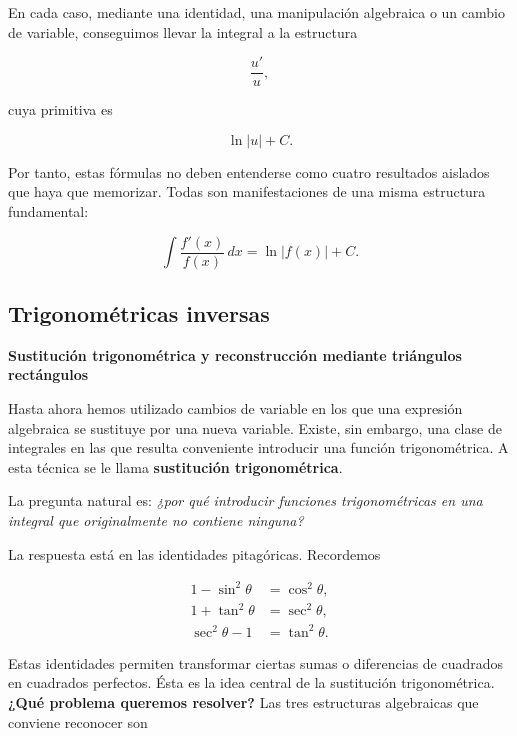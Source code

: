 \documentclass[12pt]{article}
\theoremstyle{definition}
\theoremstyle{remark}
\begin{document}
En cada caso, mediante una identidad, una manipulación algebraica
o un cambio de variable, conseguimos llevar la integral a la
estructura

\[
\boxed{\frac{u'}{u}},
\]

cuya primitiva es

\[
\boxed{\ln|u|+C}.
\]

Por tanto, estas fórmulas no deben entenderse como cuatro resultados
aislados que haya que memorizar. Todas son manifestaciones de una
misma estructura fundamental:

\[
\boxed{
\int\frac{f'(x)}{f(x)}\,dx
=
\ln|f(x)|+C.
}
\]



\subsection*{Trigonom\'etricas inversas}
\textbf{Sustitución trigonométrica y reconstrucción mediante triángulos rectángulos}

Hasta ahora hemos utilizado cambios de variable en los que una expresión
algebraica se sustituye por una nueva variable. Existe, sin embargo, una
clase de integrales en las que resulta conveniente introducir una función
trigonométrica. A esta técnica se le llama \textbf{sustitución trigonométrica}.

La pregunta natural es: \emph{¿por qué introducir funciones trigonométricas
en una integral que originalmente no contiene ninguna?}

La respuesta está en las identidades pitagóricas. Recordemos

\[
\boxed{
\begin{aligned}
1-\sin^2\theta&=\cos^2\theta,\\
1+\tan^2\theta&=\sec^2\theta,\\
\sec^2\theta-1&=\tan^2\theta.
\end{aligned}}
\]

Estas identidades permiten transformar ciertas sumas o diferencias de
cuadrados en cuadrados perfectos. Ésta es la idea central de la sustitución
trigonométrica.
\textbf{¿Qué problema queremos resolver?}
Las tres estructuras algebraicas que conviene reconocer son
\end{document}
